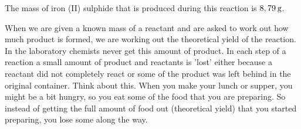 {\begin{mdframed}[linewidth=4, leftmargin=40, rightmargin=40]
\begin{exercise}
\begin{enumerate}[noitemsep, label=\textbf{Step} \textbf{\arabic*}. ]
      
      \label{m38712*id284548}The mass of iron (II) sulphide that is produced during this reaction is \begin{math}8,79\phantom{\rule{2pt}{0ex}}\mathrm{g}\end{math}. \par 
      \end{enumerate}
         

    \end{exercise}
    \end{mdframed}
    }
    \noindent
  

\label{m38712*eip-943}When we are given a known mass of a reactant and are asked to work out how much product is formed, we are working out the theoretical yield of the reaction. In the laboratory chemists never get this amount of product. In each step of a reaction a small amount of product and reactants is 'lost' either because a reactant did not completely react or some of the product was left behind in the original container. Think about this. When you make your lunch or supper, you might be a bit hungry, so you eat some of the food that you are preparing. So instead of getting the full amount of food out (theoretical yield) that you started preparing, you lose some along the way. \par \label{m38712*secfhsst!!!underscore!!!id2067}\vspace{.5cm} 
      

